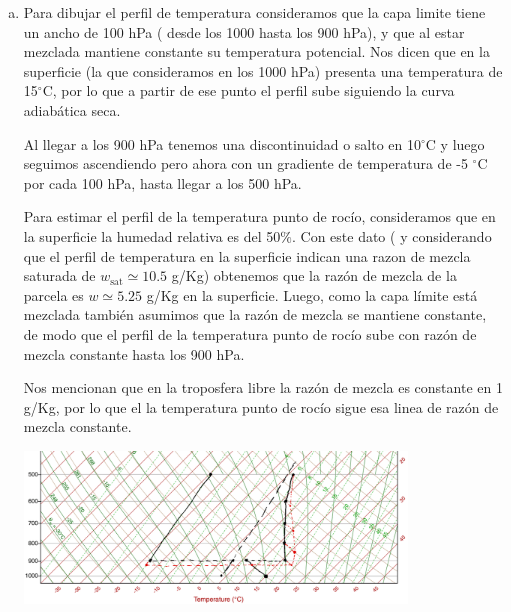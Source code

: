 \documentclass[../main.tex]{subfiles}
\begin{document}
\begin{enumerate}[a)]
    \item Para dibujar el perfil de temperatura consideramos que la capa limite tiene un ancho de 100 hPa ( desde los 1000 hasta los 900 hPa), y que al estar mezclada mantiene constante su temperatura potencial. Nos dicen que en la superficie (la que consideramos en los 1000 hPa) presenta una temperatura de 15$^{\circ}$C, por lo que a partir de ese punto el perfil sube siguiendo la curva adiabática seca. 

        Al llegar a los 900 hPa tenemos una discontinuidad o salto en 10$^{\circ}$C y luego seguimos ascendiendo pero ahora con un gradiente de temperatura de -5 $^{\circ}$C por cada 100 hPa, hasta llegar a los 500 hPa.

        Para estimar el perfil de la temperatura punto de rocío, consideramos que en la superficie la humedad relativa es del 50$\%$. Con este dato ( y considerando que el perfil de temperatura en la superficie indican una razon de mezcla saturada de  $w_\text{sat}\simeq 10.5$ g/Kg) obtenemos que la razón de mezcla de la parcela es $w \simeq 5.25$ g/Kg en la superficie. Luego, como la capa límite está mezclada también asumimos que la razón de mezcla se mantiene constante, de modo que el perfil de la temperatura punto de rocío sube con razón de mezcla constante hasta los 900 hPa.

Nos mencionan que en la troposfera libre la razón de mezcla es constante en 1 g/Kg, por lo que el la temperatura punto de rocío sigue esa linea de razón de mezcla constante.\\

\begin{minipage}{\linewidth}
    \begin{center}
        \includegraphics[width=0.8\textwidth]{img/skewT}
        \label{skewT}
    \end{center}
\end{minipage}\\


\end{enumerate}
\end{document}
